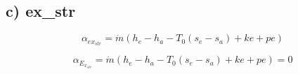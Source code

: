\subsection*{c) ex_{str}}

\begin{equation}
\alpha_{ex_{str}} = \dot{m} (h_e - h_a - T_0 (s_e - s_a) + ke + pe)
\end{equation}

\begin{equation}
\alpha_{E_{x_{str}}} = \dot{m} (h_e - h_a - T_0 (s_e - s_a) + ke + pe) = 0
\end{equation}
